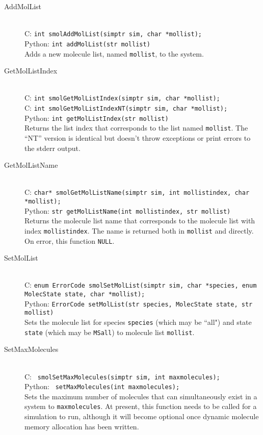 \documentclass {book}
\begin{document}
\begin{description}
\item[AddMolList]
\hfill \\
C: \texttt{int smolAddMolList(simptr sim, char *mollist);}\\
Python: \texttt{int addMolList(str mollist)}\\
Adds a new molecule list, named \texttt{mollist}, to the system.

\item[GetMolListIndex]
\hfill \\
C: \texttt{int smolGetMolListIndex(simptr sim, char *mollist);}\\
C: \texttt{int smolGetMolListIndexNT(simptr sim, char *mollist);}\\
Python: \texttt{int getMolListIndex(str mollist)}\\
Returns the list index that corresponds to the list named \texttt{mollist}. The ``NT'' version is identical but doesn't throw exceptions or print errors to the stderr output.

\item[GetMolListName]
\hfill \\
C: \texttt{char* smolGetMolListName(simptr sim, int mollistindex, char *mollist);}\\
Python: \texttt{str getMolListName(int mollistindex, str mollist)}\\
Returns the molecule list name that corresponds to the molecule list with index \texttt{mollistindex}. The name is returned both in \texttt{mollist} and directly. On error, this function \texttt{NULL}.

\item[SetMolList]
\hfill \\
C: \texttt{enum ErrorCode smolSetMolList(simptr sim, char *species, enum MolecState state, char *mollist);}\\
Python: \texttt{ErrorCode setMolList(str species, MolecState state, str mollist)}\\
Sets the molecule list for species \texttt{species} (which may be ``all") and state \texttt{state} (which may be \texttt{MSall}) to molecule list \texttt{mollist}.

\item[SetMaxMolecules]
\hfill \\
C: \texttt{ smolSetMaxMolecules(simptr sim, int maxmolecules);}\\
Python: \texttt{ setMaxMolecules(int maxmolecules);}\\
Sets the maximum number of molecules that can simultaneously exist in a system to \texttt{maxmolecules}. At present, this function needs to be called for a simulation to run, although it will become optional once dynamic molecule memory allocation has been written.


\end{description}
\end{document}
